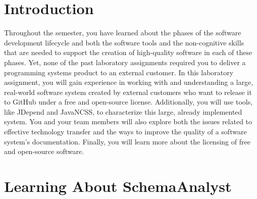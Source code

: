 

\usepackage[compact]{titlesec}

\usepackage[url=false,
    backend=biber,
    style=authoryear,
    doi=false,
    isbn=false,
    backref=false,
    dashed=false,                                   %
    maxnames=99,                                    %
    sorting=ydnt]{biblatex}                         %





\vspace*{-.1in}
\section*{Introduction}

\nocite{*}

Throughout the semester, you have learned about the phases of the software development lifecycle and both the software
tools and the non-cognitive skills that are needed to support the creation of high-quality software in each of these
phases. Yet, none of the past laboratory assignments required you to deliver a programming systems product to an
external customer. In this laboratory assignment, you will gain experience in working with and understanding a large,
real-world software system created by external customers who want to release it to GitHub under a free and open-source
license.  Additionally, you will use tools, like JDepend and JavaNCSS, to characterize this large, already implemented
system. You and your team members will also explore both the issues related to effective technology transfer and the
ways to improve the quality of a software system's documentation. Finally, you will learn more about the licensing of
free and open-source software.

\vspace*{-.05in}
\section*{Learning About SchemaAnalyst}



\vspace*{-.05in}
